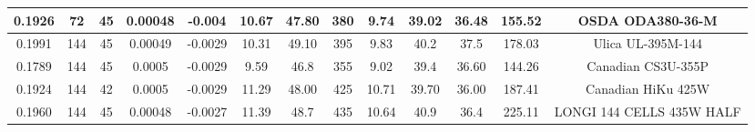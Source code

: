 \documentclass[journal,onecolumn]{IEEEtran}
\begin{document}
\begin{table}[h]
\begin{scriptsize}
\begin{tabular}{c|c|c|c|c|c|c|c|c|c|c|c|c}
0.1926 & 72 & 45 & 0.00048 & -0.004 & 10.67 & 47.80 & 380 & 9.74 & 39.02 & 36.48 & 155.52 & OSDA ODA380-36-M \\
\hline
0.1991 & 144 & 45 & 0.00049 & -0.0029 & 10.31 & 49.10 & 395 & 9.83 & 40.2 & 37.5 & 178.03 & Ulica UL-395M-144 \\
\hline
0.1789 & 144 & 45 & 0.0005 & -0.0029 & 9.59 & 46.8 & 355 & 9.02 & 39.4 & 36.60 & 144.26 &  Canadian CS3U-355P \\
\hline
0.1924 & 144 & 42 & 0.0005 & -0.0029 & 11.29 & 48.00 & 425 & 10.71 & 39.70 & 36.00 &  187.41 & Canadian HiKu 425W \\
\hline
0.1960 & 144 & 45 & 0.00048 & -0.0027 & 11.39 & 48.7 & 435 & 10.64 & 40.9 & 36.4 & 225.11 & LONGI 144 CELLS 435W HALF \\
\hline
\hline
\end{tabular}
\newline
\end{scriptsize}
\end{table}

\end{document}
